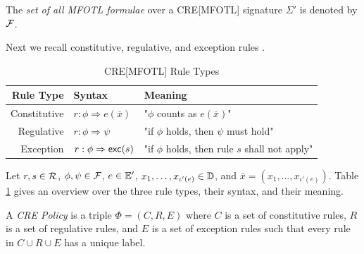 \begin{definition}
    \label{def:set-of-mfotl-formulae}
    The \emph{set of all MFOTL formulae} over a CRE[MFOTL] signature
    $\Sigma'$ is denoted by $\mathcal{F}$.
\end{definition}

Next we recall constitutive, regulative, and exception rules
\cite[Section 3.1]{lex}.

\begin{table}
    \centering
    \begin{tabular}{|r|l|l|}
        \hline
        \textbf{Rule Type}
        & \textbf{Syntax}
        & \textbf{Meaning} \\ 
        \hline
        Constitutive
            & $r: \phi \Rightarrow e(\bar{x})$
            & "$\phi$ counts as $e(\bar{x})$"
            \\
        \hline
        Regulative
            & $r: \phi \Rightarrow \psi$
            & "if $\phi$ holds, then $\psi$ must hold"
            \\
        \hline
        Exception
            & $r: \phi \Rightarrow \mathsf{exc}(s)$
            & "if $\phi$ holds, then rule $s$ shall not apply"
            \\
        \hline
    \end{tabular}
    \caption{CRE[MFOTL] Rule Types \label{tab:cre-rule-types}}
\end{table}

\begin{definition}
    \label{def:cre-rules}
    Let $r,s \in \mathcal{R}$, $\phi, \psi \in \mathcal{F}$, $e \in \mathbb{E}'$,
    $x_1, \dots, x_{\iota'(e)} \in \mathbb{D}$,
    and $\bar{x} = (x_1, \dots, x_{\iota'(e)})$.
    Table \ref{tab:cre-rule-types} gives an
    overview over the three rule types, their syntax, and
    their meaning.
\end{definition}

\begin{definition}
    \label{def:cre-policy}
    A \emph{CRE Policy} is a triple $\Phi = \left(C, R, E\right)$
    where $C$ is a set of constitutive rules, $R$ is a set of regulative
    rules, and $E$ is a set of exception rules such that
    every rule in $C \cup R \cup E$ has a unique label.
\end{definition}

